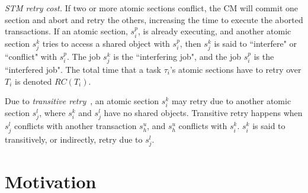\documentclass[conference]{IEEEtran}
\begin{document}
\textit{STM retry cost.} If two or more atomic sections conflict, the CM will commit one section and abort and retry the others, increasing the time to execute the aborted transactions. 
 If an atomic section, $s_i^p$, is already executing, and another atomic section $s_j^k$ tries to access a shared object with $s_i^p$, then $s_j^k$ is said to ``interfere" or ``conflict" with $s_i^p$. The job $s_j^k$ is the ``interfering job", and the job $s_i^p$ is the ``interfered job". The total time that a task $\tau_i$'s atomic sections have to retry over $T_i$ is denoted $RC(T_i)$.
% 

Due to \textit{transitive retry}~\cite{pnf_dac_asp,fblt}, an atomic section $s_i^k$ may retry due to another atomic section $s_j^l$, where $s_i^k$ and $s_j^l$ have no shared objects. Transitive retry happens when $s_j^l$ conflicts with another transaction $s_h^u$, and $s_h^u$ conflicts with $s_i^k$. $s_i^k$ is said to transitively, or indirectly, retry due to $s_j^l$.
%  

\section{Motivation}\label{sec:motivation}
\end{document}
